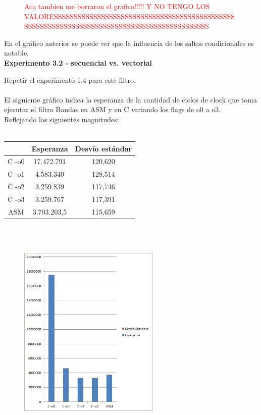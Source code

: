 \begin{figure}[h!]
  \begin{center}
    \textcolor{red}{Aca tambien me borraron el grafico!!!!! Y NO TENGO LOS VALORESSSSSSSSSSSSSSSSSSSSSSSSSSSSSSSSSSSSSSSSSSSSSSSSSSSSSSSSSSSSSSSSSSSSSSSSSSSSSSSSSSSSSSSSSSSSS}
  \end{center}
\end{figure}

En el gr\'afico anterior se puede ver que la influencia de los saltos condicionales es notable. \\

\newpage
\vspace*{0.3cm} \noindent
\textbf{Experimento 3.2 - secuencial vs. vectorial}

Repetir el experimento 1.4 para este filtro. \\
\\
El siguiente gr\'afico indica la esperanza de la cantidad de ciclos de clock que toma ejecutar el filtro Bandas en ASM y en C variando los flags de o0 a o3. \\
Reflejando las siguientes magnitudes: \\
\\
 \begin{tabular}[c]{|c|c|c|}
	\hline
		 & Esperanza & Desv\'io est\'andar\\
		\hline
C -o0 & 17.472.791 & 120,620 \\
\hline
C -o1 & 4.583.340 & 128,514 \\
\hline
C -o2 & 3.259.839 & 117,746 \\
\hline
C -o3 & 3.259.767 & 117,391  \\
\hline
ASM & 3.703.203,5 & 115,659 \\
\hline
	\end{tabular}\\\\

\begin{figure}[h!]
  \begin{center}
	\includegraphics[width=0.6\textwidth]{imagenes/32.jpg}
  \end{center}
\end{figure}

